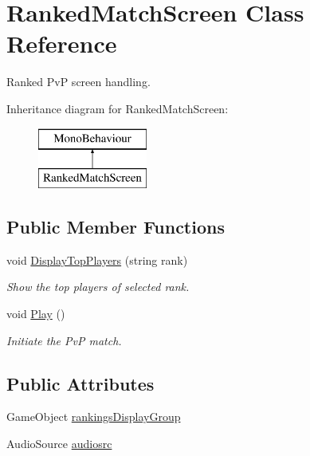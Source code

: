 \hypertarget{class_ranked_match_screen}{}\section{Ranked\+Match\+Screen Class Reference}
\label{class_ranked_match_screen}


Ranked PvP screen handling.  


Inheritance diagram for Ranked\+Match\+Screen\+:\begin{figure}[H]
\begin{center}
\leavevmode
\includegraphics[height=2.000000cm]{class_ranked_match_screen}
\end{center}
\end{figure}
\subsection*{Public Member Functions}
\begin{DoxyCompactItemize}
\item 
void \mbox{\hyperlink{class_ranked_match_screen_a6ee96d8d4c47bfca292a49198e399c1b}{Display\+Top\+Players}} (string rank)
\begin{DoxyCompactList}\small\item\em Show the top players of selected rank. \end{DoxyCompactList}\item 
void \mbox{\hyperlink{class_ranked_match_screen_a605d6d6b0092debfa254bb43835e16c1}{Play}} ()
\begin{DoxyCompactList}\small\item\em Initiate the PvP match. \end{DoxyCompactList}\end{DoxyCompactItemize}
\subsection*{Public Attributes}
\begin{DoxyCompactItemize}
\item 
Game\+Object \mbox{\hyperlink{class_ranked_match_screen_adeac07462f1e291a4f641dea869e1ff9}{rankings\+Display\+Group}}
\item 
Audio\+Source \mbox{\hyperlink{class_ranked_match_screen_aea358c317a97859c74904fceb35853ac}{audiosrc}}
\end{DoxyCompactItemize}
